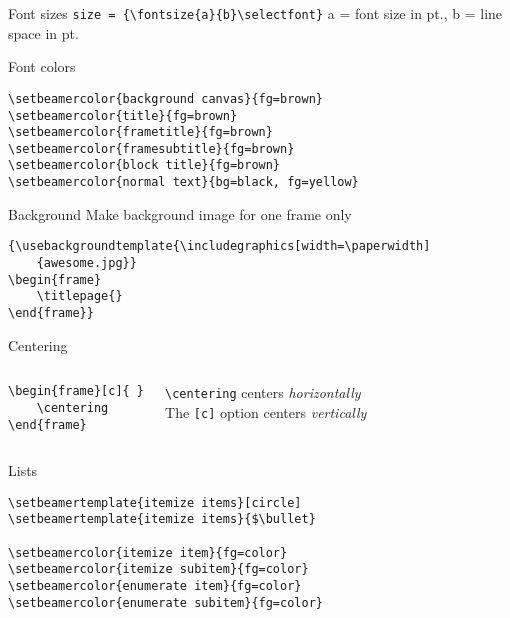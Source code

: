 \documentclass[9pt]{beamer}
\begin{document}
\begin{frame}[fragile=singleslide]{Font sizes}
    \verb|size = {\fontsize{a}{b}\selectfont}|
    a = font size in pt., b = line space in pt.
\end{frame}

\begin{frame}[fragile=singleslide]{Font colors}
\begin{verbatim}
\setbeamercolor{background canvas}{fg=brown}
\setbeamercolor{title}{fg=brown}
\setbeamercolor{frametitle}{fg=brown}
\setbeamercolor{framesubtitle}{fg=brown}
\setbeamercolor{block title}{fg=brown}
\setbeamercolor{normal text}{bg=black, fg=yellow}
\end{verbatim}
\end{frame}

\begin{frame}[fragile=singleslide]{Background}
    Make background image for one frame only
    \begin{verbatim}
{\usebackgroundtemplate{\includegraphics[width=\paperwidth]
    {awesome.jpg}}
\begin{frame}
    \titlepage{}
\end{frame}}
    \end{verbatim}
\end{frame}

\begin{frame}[fragile=singleslide]{Centering}
    \begin{columns}
    \begin{verbatim}
\begin{frame}[c]{ }
    \centering
\end{frame}
    \end{verbatim}
    \verb|\centering| centers \emph{horizontally}\\
    The \verb|[c]| option centers \emph{vertically}
    \end{columns}
\end{frame}

\begin{frame}[fragile=singleslide]{Lists}
\begin{verbatim}
\setbeamertemplate{itemize items}[circle]
\setbeamertemplate{itemize items}{$\bullet}

\setbeamercolor{itemize item}{fg=color}
\setbeamercolor{itemize subitem}{fg=color}
\setbeamercolor{enumerate item}{fg=color}
\setbeamercolor{enumerate subitem}{fg=color}
\end{verbatim}
\end{frame}%
\end{document}
